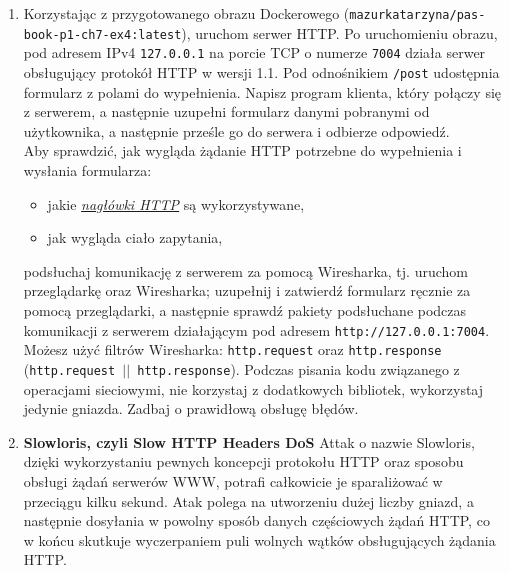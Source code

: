 \documentclass{article}
\begin{document}
\begin{enumerate}[label=\textbf{7.\arabic*}]

\item  Korzystając z przygotowanego obrazu Dockerowego (\texttt{mazurkatarzyna/pas-book-p1-ch7-ex4:latest}), uruchom serwer HTTP.  Po uruchomieniu obrazu, pod adresem IPv4 \texttt{127.0.0.1} na porcie TCP o numerze \texttt{7004} działa serwer obsługujący protokół HTTP w wersji 1.1. Pod odnośnikiem \texttt{/post} udostępnia formularz z polami do wypełnienia. Napisz program klienta, który połączy się z serwerem, a następnie uzupełni formularz danymi pobranymi od użytkownika, a następnie prześle go do serwera i odbierze odpowiedź. \\

Aby sprawdzić, jak wygląda żądanie HTTP potrzebne do wypełnienia i wysłania formularza:

\begin{itemize}
\item jakie \href{https://www.w3.org/Protocols/rfc2616/rfc2616-sec14.html}{\textit{nagłówki HTTP}} są wykorzystywane,
\item jak wygląda ciało zapytania,
\end{itemize}

podsłuchaj komunikację z serwerem za pomocą Wiresharka, tj. uruchom przeglądarkę oraz Wiresharka; uzupełnij i zatwierdź formularz ręcznie za pomocą przeglądarki, a następnie sprawdź pakiety podsłuchane podczas komunikacji z serwerem działającym pod adresem \texttt{http://127.0.0.1:7004}. Możesz użyć filtrów Wiresharka: \texttt{http.request} oraz \texttt{http.response} (\texttt{http.request $\vert\vert$ http.response}). Podczas pisania kodu związanego z operacjami sieciowymi, nie korzystaj z dodatkowych bibliotek, wykorzystaj jedynie gniazda. Zadbaj o prawidłową obsługę błędów.


\item \textbf{Slowloris, czyli Slow HTTP Headers DoS} Attak o nazwie Slowloris, dzięki wykorzystaniu pewnych koncepcji protokołu HTTP oraz sposobu obsługi żądań serwerów WWW, potrafi całkowicie je sparaliżować w przeciągu kilku sekund. Atak polega na utworzeniu dużej liczby gniazd, a następnie dosyłania w powolny sposób danych częściowych żądań HTTP, co w końcu skutkuje wyczerpaniem puli wolnych wątków obsługujących żądania HTTP.\\


\end{enumerate}
\end{document}
